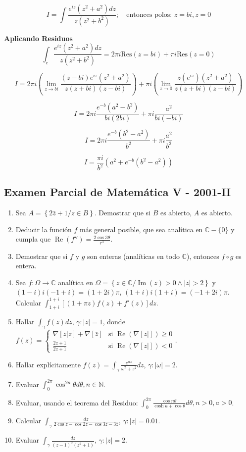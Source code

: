 \documentclass[a4paper,12pt]{article}
\begin{document}
\[
I = \int \frac{e^{iz}(z^2 + a^2) dz}{z(z^2 + b^2)}; \quad \text{entonces polos: } z = bi, z = 0
\]

\textbf{Aplicando Residuos}
\[
\int_c \frac{e^{iz}(z^2 + a^2) dz}{z(z^2 + b^2)} = 2\pi i \text{Res}(z = bi) + \pi i \text{Res}(z = 0)
\]

\[
I = 2\pi i \left( \lim_{z \to bi} \frac{(z-bi)e^{iz}(z^2 + a^2)}{z(z+bi)(z-bi)} \right) + \pi i \left( \lim_{z \to 0} \frac{z(e^{iz})(z^2 + a^2)}{z(z+bi)(z-bi)} \right)
\]

\[
I = 2\pi i \frac{e^{-b}(a^2 - b^2)}{bi(2bi)} + \pi i \frac{a^2}{bi(-bi)}
\]

\[
I = 2\pi i \frac{e^{-b}(b^2 - a^2)}{b^2} + \pi i \frac{a^2}{b^2}
\]

\[
I = \frac{\pi i}{b^2} (a^2 + e^{-b}(b^2 - a^2))
\]


\newpage
\subsection{Examen Parcial de Matemática V - 2001-II}

\begin{enumerate}
    \item Sea $A = \left\{ 2\bar{z} + 1 / z \in B \right\}$. Demostrar que si $B$ es abierto, $A$ es abierto.
    \item Deducir la función $f$ más general posible, que sea analítica en $\mathbb{C} - \{0\}$ y cumpla que $\operatorname{Re}(f'') = \frac{2 \cos 3\theta}{r^3}$.
    \item Demostrar que si $f$ y $g$ son enteras (analíticas en todo $\mathbb{C}$), entonces $f \circ g$ es entera.
    \item Sea $f : \Omega \to \mathbb{C}$ analítica en $\Omega = \left\{ z \in \mathbb{C} / \operatorname{Im}(z) > 0 \wedge |z| > 2 \right\}$ y $(1 - i) i (-1 + i) = (1 + 2i) \pi$, $(1 + i) i (1 + i) = (-1 + 2i) \pi$. Calcular $\int_{1+i}^{1+i} \left[ (1 + \pi z) f(z) + f'(z) \right] dz$.
    \item Hallar $\int_{\gamma} f(z) dz$, $\gamma : |z| = 1$, donde $f(z) = \begin{cases}
    \nabla [z|z] + \nabla [\bar{z}] & \text{si } \operatorname{Re}(\nabla [z|]) \geq 0 \\
    \frac{2z + 1}{2z + 1} & \text{si } \operatorname{Re}(\nabla [z|]) < 0
    \end{cases}$.
    \item Hallar explícitamente $f(z) = \int_{\gamma} \frac{e^{\alpha z}}{\omega^2 + z^2} dz$, $\gamma : |\omega| = 2$.
    \item Evaluar $\int_{0}^{2\pi} \cos^{2n} \theta d\theta, n \in \mathbb{N}$.
    \item Evaluar, usando el teorema del Residuo: $\int_{0}^{2\pi} \frac{\cos n\theta}{\cosh a + \cos \theta} d\theta, n > 0, a > 0$.
    \item Calcular $\int_{\gamma} \frac{dz}{2 \cos z - \cos 2z - \cos 3z - 3z}$, $\gamma : |z| = 0.01$.
    \item Evaluar $\int_{\gamma} \frac{dz}{(z - 1)^3 (z^2 + 1)}$, $\gamma : |z| = 2$.
\end{enumerate}
\end{document}

